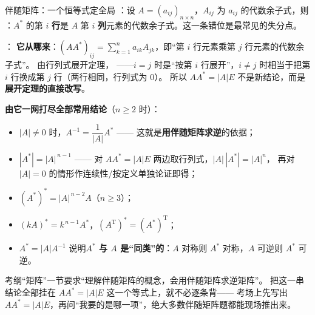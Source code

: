 



\begin{fdeep}{伴随矩阵：一个恒等式定全局}
：设 $A=(a_{ij})_{n\times n}$，$A_{ij}$ 为 $a_{ij}$ 的代数余子式，则
：$A^{*}$ 的第 $i$ \textbf{行}是 $A$ 第 $i$ \textbf{列}元素的代数余子式。这一条错位是最常见的失分点。

\medskip
{}：
\textbf{它从哪来}：$(AA^{*})_{ij}=\sum_{k=1}^{n}a_{ik}A_{jk}$，即“第 $i$ 行元素乘第 $j$ 行元素的代数余子式”。
由行列式展开定理，
——$i=j$ 时是“按第 $i$ 行展开”，$i\ne j$ 时相当于把第 $i$ 行换成第 $j$ 行（两行相同，行列式为 $0$）。
所以 $AA^{*}=|A|E$ 不是新结论，而是\textbf{展开定理的直接改写}。

\medskip
\textbf{由它一网打尽全部常用结论}（$n\ge2$ 时）：
\begin{itemize}[leftmargin=2.2em,itemsep=0.22em]
\item $|A|\ne0$ 时，$A^{-1}=\dfrac{1}{|A|}A^{*}$ —— 这就是\textbf{用伴随矩阵求逆}的依据；
\item $|A^{*}|=|A|^{\,n-1}$ —— 对 $AA^{*}=|A|E$ 两边取行列式，$|A|\,|A^{*}|=|A|^{n}$，
      再对 $|A|=0$ 的情形作连续性/按定义单独论证即得；
\item $(A^{*})^{*}=|A|^{\,n-2}A$（$n\ge3$）；
\item $(kA)^{*}=k^{\,n-1}A^{*}$，$(A^{\mathrm{T}})^{*}=(A^{*})^{\mathrm{T}}$；
\item $A^{*}=|A|A^{-1}$ 说明\textbf{$A^{*}$ 与 $A$ 是“同类”的}：$A$ 对称则 $A^{*}$ 对称，$A$ 可逆则 $A^{*}$ 可逆。
\end{itemize}
\fbref{}考纲“矩阵”一节要求“理解伴随矩阵的概念，会用伴随矩阵求逆矩阵”。
把这一串结论全部挂在 $AA^{*}=|A|E$ 这一个等式上，就不必逐条背——
考场上先写出 $AA^{*}=|A|E$，再问“我要的是哪一项”，绝大多数伴随矩阵题都能现场推出来。
\end{fdeep}


